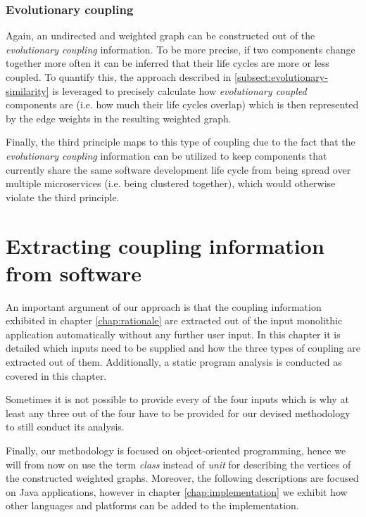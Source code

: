 \documentclass[12pt,a4paper]{report}
\begin{document}
\subsection{Evolutionary coupling}

Again, an undirected and weighted graph can be constructed out of the
\textit{evolutionary coupling} information.
To be more precise, if two components change together more often it can be
inferred that their life cycles are more or less coupled.
To quantify this, the approach described in \ref{subsect:evolutionary-similarity}
is leveraged to precisely calculate how \textit{evolutionary coupled} components
are (i.e. how much their life cycles overlap) which is then represented
by the edge weights in the resulting weighted graph.

Finally, the third principle maps to this type of coupling due to the fact that
the \textit{evolutionary coupling} information can be utilized to keep
components that currently share the same software development life cycle
from being spread over multiple microservices (i.e. being clustered together),
which would otherwise violate the third principle.




\chapter{Extracting coupling information from software} \label{chap:extracting-coupling}

An important argument of our approach is that the coupling information
exhibited in chapter \ref{chap:rationale} are extracted out of the input
monolithic application automatically without any further user input.
In this chapter it is detailed which inputs need to be supplied and
how the three types of coupling are extracted out of them. Additionally,
a static program analysis is conducted as covered in this chapter.

Sometimes it is not possible to provide every of the four inputs which is why
at least any three out of the four have to be provided for our devised
methodology to still conduct its analysis.

Finally, our methodology is focused on object-oriented programming,
hence we will from now on use the term \textit{class} instead of \textit{unit}
for describing the vertices of the constructed weighted graphs.
Moreover, the following descriptions are focused on Java applications,
however in chapter \ref{chap:implementation} we exhibit how other
languages and platforms can be added to the implementation.
\end{document}

